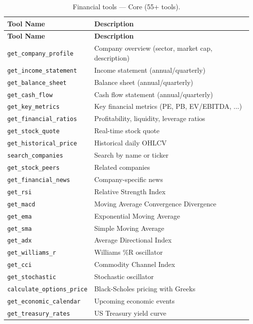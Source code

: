 \begin{longtable}{p{5cm}p{8cm}}
\caption{Financial tools --- Core (55+ tools).} \label{tab:tools-fin-core} \\
\toprule
\textbf{Tool Name} & \textbf{Description} \\
\midrule
\endfirsthead
\toprule
\textbf{Tool Name} & \textbf{Description} \\
\midrule
\endhead
\texttt{get\_company\_profile} & Company overview (sector, market cap, description) \\
\texttt{get\_income\_statement} & Income statement (annual/quarterly) \\
\texttt{get\_balance\_sheet} & Balance sheet (annual/quarterly) \\
\texttt{get\_cash\_flow} & Cash flow statement (annual/quarterly) \\
\texttt{get\_key\_metrics} & Key financial metrics (PE, PB, EV/EBITDA, ...) \\
\texttt{get\_financial\_ratios} & Profitability, liquidity, leverage ratios \\
\texttt{get\_stock\_quote} & Real-time stock quote \\
\texttt{get\_historical\_price} & Historical daily OHLCV \\
\texttt{search\_companies} & Search by name or ticker \\
\texttt{get\_stock\_peers} & Related companies \\
\texttt{get\_financial\_news} & Company-specific news \\
\texttt{get\_rsi} & Relative Strength Index \\
\texttt{get\_macd} & Moving Average Convergence Divergence \\
\texttt{get\_ema} & Exponential Moving Average \\
\texttt{get\_sma} & Simple Moving Average \\
\texttt{get\_adx} & Average Directional Index \\
\texttt{get\_williams\_r} & Williams \%R oscillator \\
\texttt{get\_cci} & Commodity Channel Index \\
\texttt{get\_stochastic} & Stochastic oscillator \\
\texttt{calculate\_options\_price} & Black-Scholes pricing with Greeks \\
\texttt{get\_economic\_calendar} & Upcoming economic events \\
\texttt{get\_treasury\_rates} & US Treasury yield curve \\

\end{longtable}
